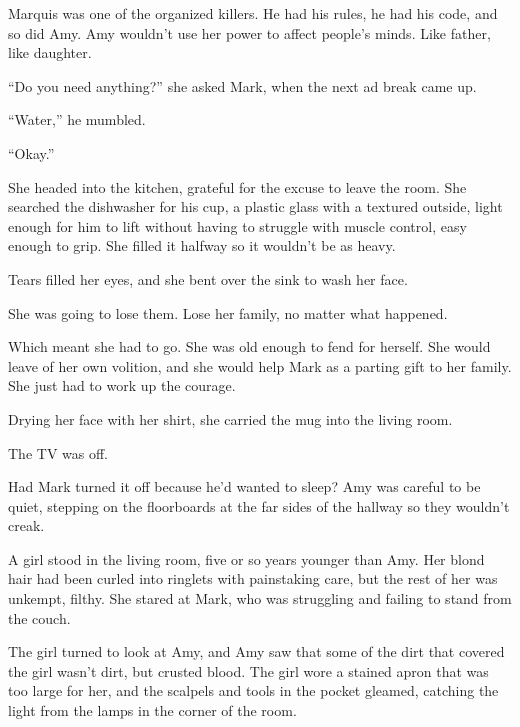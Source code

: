 Marquis was one of the organized killers.  He had his rules, he had his code, and so did Amy.  Amy wouldn't use her power to affect people's minds.  Like father, like daughter.



``Do you need anything?'' she asked Mark, when the next ad break came up.



``Water,'' he mumbled.



``Okay.''



She headed into the kitchen, grateful for the excuse to leave the room.  She searched the dishwasher for his cup, a plastic glass with a textured outside, light enough for him to lift without having to struggle with muscle control, easy enough to grip.  She filled it halfway so it wouldn't be as heavy.



Tears filled her eyes, and she bent over the sink to wash her face.



She was going to lose them.  Lose her family, no matter what happened.



Which meant she had to go.  She was old enough to fend for herself.  She would leave of her own volition, and she would help Mark as a parting gift to her family.  She just had to work up the courage.



Drying her face with her shirt, she carried the mug into the living room.



The TV was off.



Had Mark turned it off because he'd wanted to sleep?  Amy was careful to be quiet, stepping on the floorboards at the far sides of the hallway so they wouldn't creak.



A girl stood in the living room, five or so years younger than Amy.  Her blond hair had been curled into ringlets with painstaking care, but the rest of her was unkempt, filthy.  She stared at Mark, who was struggling and failing to stand from the couch.



The girl turned to look at Amy, and Amy saw that some of the dirt that covered the girl wasn't dirt, but crusted blood.  The girl wore a stained apron that was too large for her, and the scalpels and tools in the pocket gleamed, catching the light from the lamps in the corner of the room.



